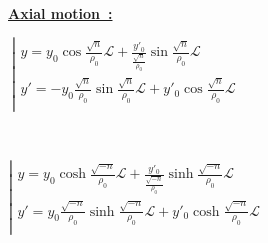 \documentclass[12pt]{article}
\newcommand{\blue}{\color{blue}}
\begin{document}
{~


{\blue \bf  \underline{Axial motion~: }}

\medskip

\begin{minipage}{0.49\linewidth}


$~ \left| 
\begin{array}{l} 
 y = y_0 \cos\frac{\textstyle{\sqrt{n}}}{\textstyle{\rho_0}}  \mathcal{L} + \frac{\textstyle{y'_0}}{\textstyle{\frac{\textstyle{\sqrt{n}}}{\textstyle{\rho_0}}}}  \sin\frac{\textstyle{\sqrt{n}}}{\textstyle{\rho_0}}  \mathcal{L}  \\
 y' = -y_0 \frac{\textstyle{\sqrt{n}}}{\textstyle{\rho_0}} \sin\frac{\textstyle{\sqrt{n}}}{\textstyle{\rho_0}}  \mathcal{L} + y'_0  \cos\frac{\textstyle{\sqrt{n}}}{\textstyle{\rho_0}}  \mathcal{L} \\
\end{array} \right.$

~


\end{minipage}
\begin{minipage}{0.49\linewidth}


$ \left| 
\begin{array}{l} 
 y = y_0 \cosh\frac{\textstyle{\sqrt{-n}}}{\textstyle{\rho_0}} \mathcal{L} + \frac{\textstyle{y'_0}}{\textstyle{\frac{\textstyle{\sqrt{-n}}}{\textstyle{\rho_0}}}}  \sinh\frac{\textstyle{\sqrt{-n}}}{\textstyle{\rho_0}}  \mathcal{L} \\ 
 y' = y_0 \frac{\textstyle{\sqrt{-n}}}{\textstyle{\rho_0}} \sinh\frac{\textstyle{\sqrt{-n}}}{\textstyle{\rho_0}}  \mathcal{L} + y'_0  \cosh\frac{\textstyle{\sqrt{-n}}}{\textstyle{\rho_0}}  \mathcal{L} \\
\end{array} \right.$

\end{minipage}

}





\clearpage 
\end{document}
